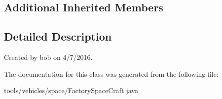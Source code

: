 \subsection*{Additional Inherited Members}


\subsection{Detailed Description}
Created by bob on 4/7/2016. 

The documentation for this class was generated from the following file\+:\begin{DoxyCompactItemize}
\item 
tools/vehicles/space/Factory\+Space\+Craft.\+java\end{DoxyCompactItemize}
